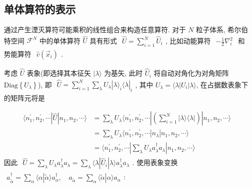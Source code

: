\documentclass[../../main.tex]{subfiles}
\begin{document}
\subsection{单体算符的表示}
通过产生湮灭算符可能乘积的线性组合来构造任意算符. 对于 $N$ 粒子体系, 希尔伯特空间 $\mathcal{F}^{N}$ 中的单体算符 $\hat{U}$ 具有形式 $\begin{aligned}
  \hat{U} = \sum_{i=1}^{N}\hat{U}_{i}
\end{aligned}$, 比如动能算符 $\begin{aligned}
  -\frac{1}{2}\nabla_{i}^{2}
\end{aligned}$ 和势能算符 $\begin{aligned}
  \hat{v}\left(\vec{x}_{i}\right)
\end{aligned}$. 

考虑 $\hat{U}$ 表象(即选择其本征矢 $|\lambda\rangle$ 为基矢, 此时 $\hat{U}_{i}$ 将自动对角化为对角矩阵 $\text{Diag}\left\{U_{\lambda}\right\}$), 即 $\begin{aligned}
  \hat{U} = \sum_{i=1}^{N}\sum_{\lambda}U_{\lambda}|\lambda\rangle_{i}\langle\lambda|_{i}
\end{aligned}$, 其中 $U_{\lambda} = \langle\lambda|U_{i}|\lambda\rangle$, 在占据数表象下的矩阵元将是

\begin{align*}
  \langle n_{1}^{\prime},n_{2}^{\prime},\cdots|\hat{U}|n_{1},n_{2},\cdots\rangle &= \sum_{\lambda}U_{\lambda}\langle n_{1}^{\prime},n_{2}^{\prime},\cdots|\left(\sum_{i=1}^{N}|\lambda\rangle\langle\lambda|\right)|n_{1},n_{2},\cdots\rangle\\
  &= \sum_{\lambda}U_{\lambda}\langle n_{1}^{\prime},n_{2}^{\prime},\cdots|n_{\lambda}|n_{1},n_{2},\cdots\rangle\\
  &= \langle n_{1}^{\prime},n_{2}^{\prime},\cdots|\sum_{\lambda}U_{\lambda}a_{\lambda}^{\dagger}a_{\lambda}|n_{1},n_{2},\cdots\rangle 
\end{align*}
因此 $\begin{aligned}
  \hat{U} = \sum_{\lambda}U_{\lambda}a_{\lambda}^{\dagger}a_{\lambda} = \sum_{\lambda}\langle\lambda|\hat{U}_{i}|\lambda\rangle a_{\lambda}^{\dagger}a_{\lambda}
\end{aligned}$. 使用表象变换 $\begin{aligned}
  a_{\widetilde{\alpha}}^{\dagger} = \sum_{\alpha}\langle\alpha|\widetilde{\alpha}\rangle a_{\alpha}^{\dagger},\quad a_{\widetilde{\alpha}} = \sum_{\alpha}\langle \widetilde{\alpha}|\alpha\rangle a_{\alpha}
\end{aligned}$:
\end{document}

